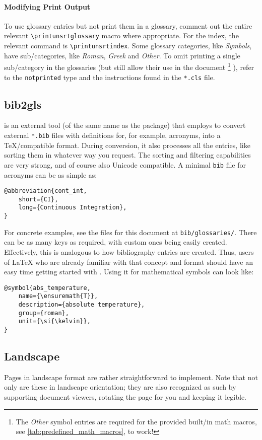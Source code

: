 \paragraph{Modifying Print Output}
To use glossary entries but not print them in a glossary, comment out the entire
relevant \verb|\printunsrtglossary| macro where appropriate.
For the index, the relevant command is \verb|\printunsrtindex|.
Some glossary categories, like \emph{Symbols}, have sub\-/categories, like \emph{Roman},
\emph{Greek} and \emph{Other}.
To omit printing a single sub\-/category in the glossaries (but still allow their use
in the document%
\footnote{
    The \emph{Other} symbol entries are required for the provided built\-/in math
    macros, see \cref{tab:predefined_math_macros}, to work!%
}%
), refer to the \texttt{notprinted} type and the instructions found in the \texttt{*.cls}
file.

\subsection{bib2gls}
\label{ch:bib2gls}

 is an external tool (of the same name as the package) that
 employs to convert external \texttt{*.bib} files with
definitions for, for example, acronyms, into a \TeX{}\-/compatible format.
During conversion, it also processes all the entries, like sorting them in whatever
way you request.
The sorting and filtering capabilities are very strong, and of course also Unicode
compatible.
A minimal \texttt{bib} file for acronyms can be as simple as:
\begin{verbatim}
@abbreviation{cont_int,
    short={CI},
    long={Continuous Integration},
}
\end{verbatim}
For concrete examples, see the files for this document at \texttt{bib/glossaries/}.
There can be as many keys as required, with custom ones being easily created.
Effectively, this is analogous to how bibliography entries are created.
Thus, users of \LaTeX{} who are already familiar with that concept and format
should have an easy time getting started with .
Using it for mathematical symbols can look like:
\begin{verbatim}
@symbol{abs_temperature,
    name={\ensuremath{T}},
    description={absolute temperature},
    group={roman},
    unit={\si{\kelvin}},
}
\end{verbatim}

\begin{landscape}
    \section{Landscape}

    Pages in landscape format are rather straightforward to implement.
    Note that not only are these in landscape orientation; they are also recognized
    as such by supporting document viewers, rotating the page for you and keeping
    it legible.
\end{landscape}
